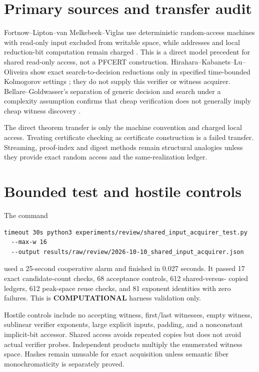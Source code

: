 \documentclass[11pt]{article}
\begin{document}
\section{Primary sources and transfer audit}
Fortnow--Lipton--van Melkebeek--Viglas use deterministic random-access
machines with read-only input excluded from writable space, while addresses
and local reduction-bit computation remain charged \cite{flmv2005}.  This is
a direct model precedent for shared read-only access, not a PFCERT
construction.  Hirahara--Kabanets--Lu--Oliveira show exact search-to-decision
reductions only in specified time-bounded Kolmogorov settings
\cite{hklo2024}; they do not supply this verifier or witness acquirer.
Bellare--Goldwasser's separation of generic decision and search under a
complexity assumption confirms that cheap verification does not generally
imply cheap witness discovery \cite{bellaregoldwasser1994}.

The direct theorem transfer is only the machine convention and charged local
access.  Treating certificate checking as certificate construction is a
failed transfer.  Streaming, proof-index and digest methods remain structural
analogies unless they provide exact random access and the same-realization
ledger.

\section{Bounded test and hostile controls}
The command
\begin{verbatim}
timeout 30s python3 experiments/review/shared_input_acquirer_test.py
  --max-w 16
  --output results/raw/review/2026-10-10_shared_input_acquirer.json
\end{verbatim}
used a 25-second cooperative alarm and finished in 0.027 seconds.  It passed
17 exact candidate-count checks, 68 acceptance controls, 612 shared-versus-
copied ledgers, 612 peak-space reuse checks, and 81 exponent identities with
zero failures.  This is \textbf{COMPUTATIONAL} harness validation only.

Hostile controls include no accepting witness, first/last witnesses, empty
witness, sublinear verifier exponents, large explicit inputs, padding, and a
nonconstant implicit-bit accessor.  Shared access avoids repeated copies but
does not avoid actual verifier probes.  Independent products multiply the
enumerated witness space.  Hashes remain unusable for exact acquisition
unless semantic fiber monochromaticity is separately proved.
\end{document}
